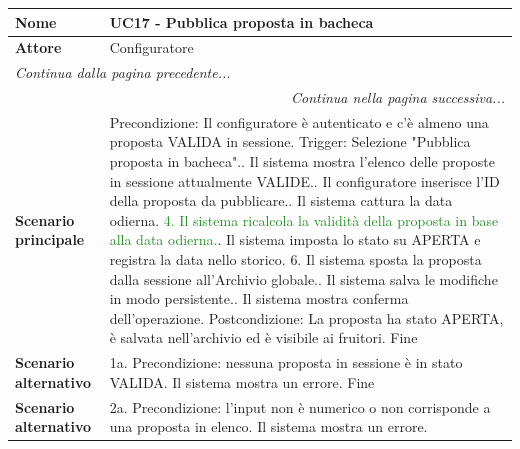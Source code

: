 \documentclass[12pt, a4paper, oneside]{report}
\begin{document}
\begin{tabularx}{\textwidth}{|l|X|}
    \hline
    \textbf{Nome}               & \textbf{UC17 - Pubblica proposta in bacheca} \\ \hline
    \textbf{Attore}             & Configuratore \\ \hline
    \endfirsthead 
    \hline
    \multicolumn{2}{|l|}{\textit{Continua dalla pagina precedente...}} \\ \hline
    \endhead 
    \hline
    \multicolumn{2}{|r|}{\textit{Continua nella pagina successiva...}} \\ \hline
    \endfoot 
    \hline
    \endlastfoot
    \textbf{Scenario principale} & 
    Precondizione: Il configuratore è autenticato e c'è almeno una proposta VALIDA in sessione.\newline
    Trigger: Selezione "Pubblica proposta in bacheca".\newline
    1. Il sistema mostra l'elenco delle proposte in sessione attualmente VALIDE.\newline
    2. Il configuratore inserisce l'ID della proposta da pubblicare.\newline
    3. Il sistema cattura la data odierna.\newline
    \textcolor{ForestGreen}{4. Il sistema ricalcola la validità della proposta in base alla data odierna.}\newline
    5. Il sistema imposta lo stato su APERTA e registra la data nello storico.\newline
    \textcolor{BurntOrange}{6. Il sistema sposta la proposta dalla sessione all'Archivio globale.}\newline
    7. Il sistema salva le modifiche in modo persistente.\newline
    8. Il sistema mostra conferma dell'operazione.\newline
    Postcondizione: La proposta ha stato APERTA, è salvata nell'archivio ed è visibile ai fruitori.\newline
    Fine \\ \hline
    \textbf{Scenario alternativo} & 
    1a. Precondizione: nessuna proposta in sessione è in stato VALIDA.\newline
    Il sistema mostra un errore.\newline
    Fine \\ \hline
    \textbf{Scenario alternativo} & 
    2a. Precondizione: l'input non è numerico o non corrisponde a una proposta in elenco.\newline
    Il sistema mostra un errore.\newline

\end{tabularx}
\end{document}
